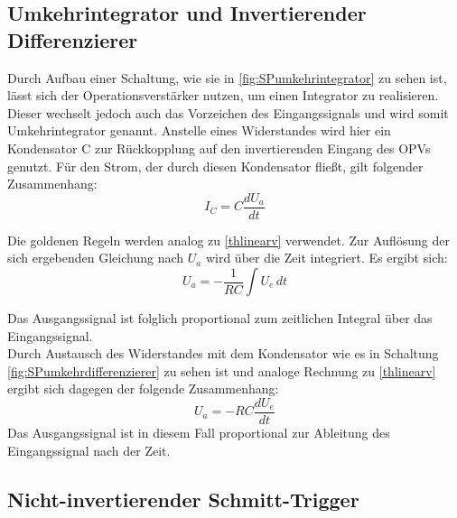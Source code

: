 \subsection{Umkehrintegrator und Invertierender Differenzierer}


Durch Aufbau einer Schaltung, wie sie in \autoref{fig:SPumkehrintegrator} zu sehen ist, lässt sich der Operationsverstärker nutzen, um einen Integrator zu realisieren.
Dieser wechselt jedoch auch das Vorzeichen des Eingangssignals und wird somit Umkehrintegrator genannt.
Anstelle eines Widerstandes wird hier ein Kondensator C zur Rückkopplung auf den invertierenden Eingang des OPVs genutzt.
Für den Strom, der durch diesen Kondensator fließt, gilt folgender Zusammenhang:
\begin{equation} 
I_C = C\frac{dU_a}{dt}
\end{equation} 

Die goldenen Regeln werden analog zu \autoref{thlinearv} verwendet. Zur Auflösung der sich ergebenden Gleichung nach $U_a$ wird über die Zeit integriert. Es ergibt sich:
\begin{equation} 
U_a = -\frac{1}{RC} \int U_e \,dt
\end{equation} 

Das Ausgangssignal ist folglich proportional zum zeitlichen Integral über das Eingangssignal.\\
Durch Austausch des Widerstandes mit dem Kondensator wie es in Schaltung \autoref{fig:SPumkehrdifferenzierer} zu sehen ist und analoge Rechnung zu \autoref{thlinearv} ergibt sich dagegen der folgende Zusammenhang:
\begin{equation} 
U_a = -RC \frac{dU_e}{dt}
\end{equation} 
Das Ausgangssignal ist in diesem Fall proportional zur Ableitung des Eingangssignal nach der Zeit.\\



\subsection{Nicht-invertierender Schmitt-Trigger}

